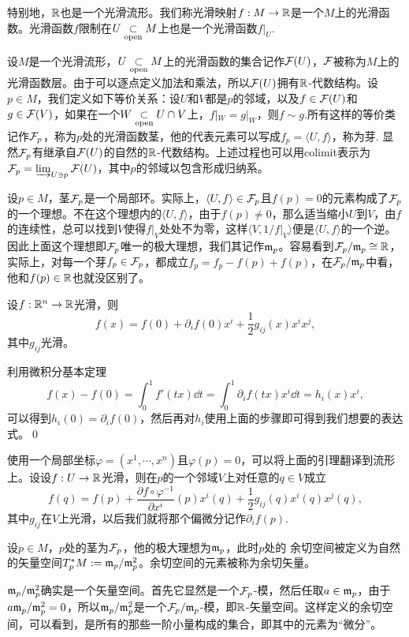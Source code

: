 特别地，$\mathbb{R}$也是一个光滑流形。我们称光滑映射$f:M\to \mathbb{R}$是一个$M$上的光滑函数。光滑函数$f$限制在$U\underset{\mathrm{open}}{\subset} M$上也是一个光滑函数$f|_U$.

\para 设$M$是一个光滑流形，$U\underset{\mathrm{open}}{\subset} M$上的光滑函数的集合记作$\mathcal{F}(U)$，$\mathcal{F}$被称为$M$上的光滑函数{\kaishu 层}。由于可以逐点定义加法和乘法，所以$\mathcal{F}(U)$拥有$\mathbb{R}$-代数结构。设$p\in M$，我们定义如下等价关系：设$U$和$V$都是$p$的邻域，以及$f\in \mathcal{F}(U)$和$g\in \mathcal{F}(V)$，如果在一个$W\underset{\mathrm{open}}{\subset} U\cap V$上，$f|_W=g|_W$，则$f\sim g$.所有这样的等价类记作$\mathcal{F}_p$，称为$p$处的光滑函数{\kaishu 茎}，他的代表元素可以写成$f_p=\langle U,f\rangle$，称为{\kaishu 芽}. 显然$\mathcal{F}_p$有继承自$\mathcal{F}(U)$的自然的$\mathbb{R}$-代数结构。上述过程也可以用colimit表示为$\mathcal{F}_p=\varinjlim_{U\ni p}\mathcal{F}(U)$，其中$p$的邻域以包含形成归纳系。

设$p\in M$，茎$\mathcal{F}_p$是一个局部环。实际上，$\langle U,f\rangle \in \mathcal{F}_p$且$f(p)= 0$的元素构成了$\mathcal{F}_p$的一个理想。不在这个理想内的$\langle U,f\rangle$，由于$f(p)\neq 0$，那么适当缩小$U$到$V$，由$f$的连续性，总可以找到$V$使得$f|_V$处处不为零，这样$\langle V,1/f|_V\rangle$便是$\langle U,f\rangle$的一个逆。因此上面这个理想即$\mathcal{F}_p$唯一的极大理想，我们其记作$\mathfrak{m}_p$。容易看到$\mathcal{F}_p/\mathfrak{m}_p\cong \mathbb{R}$，实际上，对每一个芽$f_p\in\mathcal{F}_p$，都成立$f_p=f_p-f(p)+f(p)$，在$\mathcal{F}_p/\mathfrak{m}_p$中看，他和$f(p)\in\mathbb{R}$也就没区别了。

\lem 设$f:\mathbb{R}^n\to \mathbb{R}$光滑，则
\[
	f(x)=f(0)+\partial_if(0)x^i+\frac{1}{2}g_{ij}(x)x^ix^j,
\]
其中$g_{ij}$光滑。

\proof 利用微积分基本定理
\[
	f(x)-f(0)=\int_0^1f'(tx)\dd t=\int_0^1\partial_i f(tx)x^i\dd t=h_i(x)x^i,
\]
可以得到$h_i(0)=\partial_i f(0)$，然后再对$h_i$使用上面的步骤即可得到我们想要的表达式。\qed

\para 使用一个局部坐标$\varphi=(x^1,\cdots,x^n)$且$\varphi(p)=0$，可以将上面的引理翻译到流形上。设设$f:U\to \mathbb{R}$光滑，则在$p$的一个邻域$V$上对任意的$q\in V$成立
\[
	f(q)=f(p)+\frac{\partial f\circ \varphi^{-1}}{\partial x^i}(p)x^i(q)+\frac{1}{2}g_{ij}(q)x^i(q)x^j(q),
\]
其中$g_{ij}$在$V$上光滑，以后我们就将那个偏微分记作$\partial_i f(p)$.


\para 设$p\in M$，$p$处的茎为$\mathcal{F}_p$，他的极大理想为$\mathfrak{m}_p$，此时$p$处的 余切空间被定义为自然的矢量空间$T_p^*M:=\mathfrak{m}_p/\mathfrak{m}_p^2$。余切空间的元素被称为余切矢量。

$\mathfrak{m}_p/\mathfrak{m}_p^2$确实是一个矢量空间。首先它显然是一个$\mathcal{F}_p$-模，然后任取$a\in \mathfrak{m}_p$，由于$a\mathfrak{m}_p/\mathfrak{m}_p^2=0$，所以$\mathfrak{m}_p/\mathfrak{m}_p^2$是一个$\mathcal{F}_p/\mathfrak{m}_p$-模，即$\mathbb{R}$-矢量空间。这样定义的余切空间，可以看到，是所有的那些一阶小量构成的集合，即其中的元素为“微分”。



